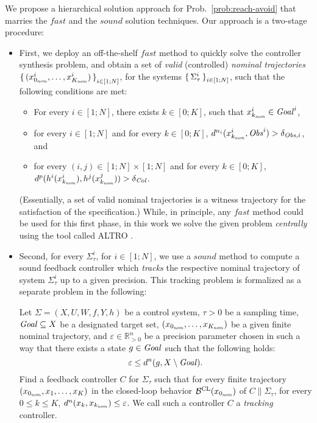 We propose a hierarchical solution approach for Prob.~\ref{prob:reach-avoid} that marries the $\mathit{fast}$ and the $\mathit{sound}$ solution techniques.
Our approach is a two-stage procedure: 
\begin{itemize}
	\item First, we deploy an off-the-shelf $\mathit{fast}$ method to quickly solve the controller synthesis problem, and obtain a set of  \emph{valid} (controlled) \emph{nominal trajectories} $\set{(x_{0_{\mathit{nom}}}^i,\ldots,x_{K_{\mathit{nom}}}^i)}_{i\in [1;N]}$, for the systems $\set{\Sigma_\tau^i}_{i\in [1;N]}$, such that the following conditions are met:
	\begin{itemize}
		\item For every $i\in [1;N]$, there exists $k\in [0;K]$, such that $x_{k_{\mathit{nom}}}^i\in \mathit{Goal}^i$,
		\item for every $i\in [1;N]$ and for every $k\in [0;K]$, $d^{n_i}(x_{k_{\mathit{nom}}}^i,\mathit{Obs}^i) > \delta_{\mathit{Obs},i}$, and
		\item for every $(i,j)\in [1;N]\times [1;N]$ and for every $k\in [0;K]$, $d^{p}(h^i(x_{k_{\mathit{nom}}}^i), h^j(x_{k_{\mathit{nom}}}^j)) > \delta_{\mathit{Col}}$. 
	\end{itemize}
	(Essentially, a set of valid nominal trajectories is a witness trajectory for the satisfaction of the specification.)
	While, in principle, any $\mathit{fast}$ method could be used for this first phase, in this work we solve the given problem \emph{centrally} using the tool called ALTRO \cite{howell2019altro}.
	\item Second, for every $\Sigma^i_\tau$, for $i\in [1;N]$, we use a $\mathit{sound}$ method to compute a sound feedback controller which \emph{tracks} the respective nominal trajectory of system $\Sigma^i_\tau$ up to a given precision.
This tracking problem is formalized as a separate problem in the following:
		\begin{problem}\label{prob:tracking_with_time}
			Let $\Sigma=(X,U,W,f,Y,h)$ be a control system, $\tau>0$ be a sampling time, $\mathit{Goal}\subseteq X$ be a designated target set, $(x_{0_{\mathit{nom}}},\ldots,x_{K_{\mathit{nom}}})$ be a given finite nominal trajectory, and $\varepsilon\in \mathbb{R}^{n}_{>0}$ be a precision parameter chosen in such a way that there exists a state $g\in \mathit{Goal}$ such that the following holds:
			\begin{equation}\label{eq:choice of eps}
				\varepsilon \leq d^n(g, X\setminus \mathit{Goal}). 
			\end{equation}
			Find a feedback controller $C$ for $\Sigma_\tau$ such that 
			for every finite trajectory $(x_{0_{\mathit{nom}}},x_1,\ldots,x_K)$ in the closed-loop behavior $\mathcal{B}^{\mathrm{CL}}(x_{0_{\mathit{nom}}})$ of $C \parallel \Sigma_\tau$, for every $0\leq k \leq K$, $d^n(x_k, x_{k_{\mathit{nom}}}) \leq \varepsilon$.
			We call such a controller $C$ a \emph{tracking} controller.
		\end{problem}
\end{itemize}

